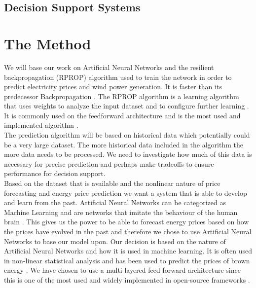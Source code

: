 \documentclass[twoside,11pt,openright]{report}
\begin{document}
\subsection{Decision Support Systems}


\section{The Method}
We will base our work on Artificial Neural Networks and the resilient backpropagation (RPROP) algorithm used to train the network in order to predict electricity prices and wind power generation. It is faster than its predecessor Backpropagation \cite{8,15}.  The RPROP algorithm is a learning algorithm that uses weights to analyze the input dataset and to configure further learning \cite{17}. It is commonly used on the feedforward architecture and is the most used and implemented algorithm \cite{14,17}.
\\[0.5cm] 
The prediction algorithm will be based on historical data which potentially could be a very large dataset. The more historical data included in the algorithm the more data needs to be processed. We need to investigate how much of this data is necessary for precise prediction and perhaps make tradeoffs to ensure performance for decision support.
\\[0.5cm]
Based on the dataset that is available and the nonlinear nature of price forecasting and energy price prediction we want a system that is able to develop and learn from the past. Artificial Neural Networks can be categorized as Machine Learning \cite{18} and are networks that imitate the behaviour of the human brain \cite{1}. This gives us the power to be able to forecast energy prices based on how the prices have evolved in the past and therefore we chose to use Artificial Neural Networks to base our model upon. Our decision is based on the nature of Artificial Neural Networks and how it is used in machine learning. It is often used in non-linear statistical analysis \cite{16} and has been used to predict the prices of brown energy \cite{2,3}. We have chosen to use a multi-layered feed forward architecture since this is one of the most used and widely implemented in open-source frameworks \cite{17}.
\end{document}
